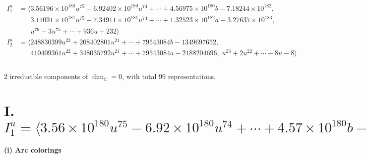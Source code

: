\documentclass[1p]{elsarticle_modified}
\theoremstyle{definition}
\begin{document}
\begin{align*}
I^u_{1}&=\langle 
3.56196\times10^{180} u^{75}-6.92402\times10^{180} u^{74}+\cdots+4.56975\times10^{180} b-7.18244\times10^{182},\\
\phantom{I^u_{1}}&\phantom{= \langle  }3.11091\times10^{181} u^{75}-7.34911\times10^{181} u^{74}+\cdots+1.32523\times10^{182} a-3.27637\times10^{183},\\
\phantom{I^u_{1}}&\phantom{= \langle  }u^{76}-3 u^{75}+\cdots+936 u+232\rangle \\
I^u_{2}&=\langle 
248830399 u^{22}+208402801 u^{21}+\cdots+79543084 b-1349697652,\\
\phantom{I^u_{2}}&\phantom{= \langle  }410409361 u^{22}+348035792 u^{21}+\cdots+79543084 a-2188204696,\;u^{23}+2 u^{22}+\cdots-8 u-8\rangle \\
\\
\end{align*}
\raggedright * 2 irreducible components of $\dim_{\mathbb{C}}=0$, with total 99 representations.\\
\newpage
\renewcommand{\arraystretch}{1}
\centering \section*{I. $I^u_{1}= \langle 3.56\times10^{180} u^{75}-6.92\times10^{180} u^{74}+\cdots+4.57\times10^{180} b-7.18\times10^{182},\;3.11\times10^{181} u^{75}-7.35\times10^{181} u^{74}+\cdots+1.33\times10^{182} a-3.28\times10^{183},\;u^{76}-3 u^{75}+\cdots+936 u+232 \rangle$}
\flushleft \textbf{(i) Arc colorings}\\
\end{document}
